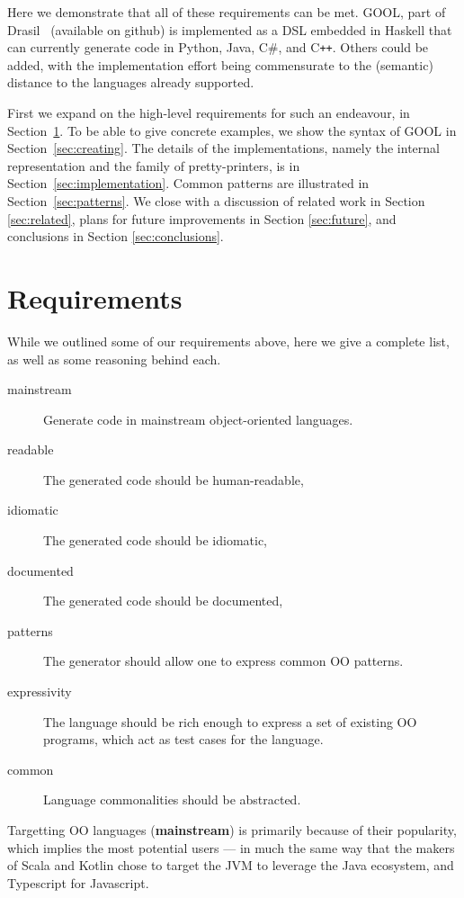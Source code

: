 \documentclass[sigplan,review,prologue,dvipsnames]{acmart}
\newcommand{\Csharp}{C\#}
\newcommand{\Cplusplus}{C\texttt{++}}
\newcommand{\abbrev}[1]{\textbf{#1}}
\newcommand{\mainstream}{\abbrev{mainstream}}
\begin{document}
Here we demonstrate that all of these requirements can be met.
GOOL, part of Drasil~\cite{Drasil2019} (available on github)
is implemented as a DSL embedded in Haskell that
can currently generate code in Python, Java, \Csharp, and \Cplusplus.
Others could be added, with the implementation effort being commensurate to the
(semantic) distance to the languages already supported.

First we expand on the high-level requirements for such an endeavour, in
Section~\ref{sec:req}.  To be able to give concrete examples, we
show the syntax of GOOL in Section~\ref{sec:creating}. The details of
the implementations, namely the internal representation and the
family of pretty-printers, is in Section~\ref{sec:implementation}.
Common patterns are illustrated in Section~\ref{sec:patterns}.  We
close with a discussion of related work in Section \ref{sec:related}, plans for
future improvements in Section \ref{sec:future}, and conclusions in Section
\ref{sec:conclusions}.

\section{Requirements} \label{sec:req}

While we outlined some of our requirements above, here we give a
complete list, as well as some reasoning behind each.

\begin{description}
\item[mainstream] Generate code in mainstream object-oriented languages.
\item[readable] The generated code should be human-readable,
\item[idiomatic] The generated code should be idiomatic,
\item[documented] The generated code should be documented,
\item[patterns] The generator should allow one to express common OO patterns.
\item[expressivity] The language should be rich enough to express a
set of existing OO programs, which act as test cases for the language.
\item[common] Language commonalities should be abstracted.
\end{description}

Targetting OO languages (\mainstream) is primarily because of their popularity,
which implies the most potential users --- in much the same way that the makers
of Scala and Kotlin chose to target the JVM to leverage the Java ecosystem, and
Typescript for Javascript.
\end{document}
